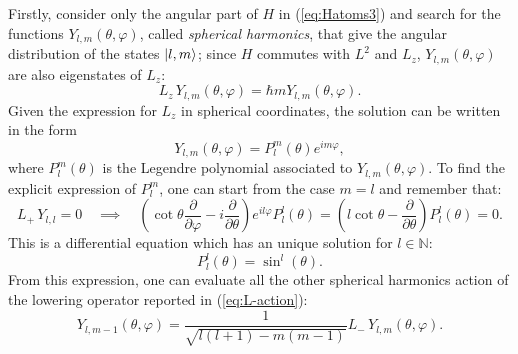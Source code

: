 Firstly, consider only the angular part of $H$ in (\ref{eq:Hatoms3}) and search for the functions $Y_{l,m}(\theta,\varphi)$, called \textit{spherical harmonics}, that give the angular distribution of the states $\ket{l,m}$; since $H$ commutes with $L^2$ and $L_z$, $Y_{l,m}(\theta,\varphi)$ are also eigenstates of $L_z$:
\begin{equation*}
    L_z \, Y_{l,m}(\theta,\varphi) = \hbar m Y_{l,m}(\theta,\varphi).
\end{equation*}
Given the expression for $L_z$ in spherical coordinates, the solution can be written in the form
\begin{equation}
    Y_{l,m}(\theta, \varphi) = P_l^m(\theta) e^{im\varphi}, 
\end{equation}
where $P_l^m(\theta)$ is the Legendre polynomial associated to $Y_{l,m}(\theta, \varphi)$. To find the explicit expression of $P_l^m$, one can start from the case $m = l$ and remember that:
\begin{equation*}
     L_+ \, Y_{l,l} = 0 \quad \implies \quad \left( \cot{\theta} \frac{\partial}{\partial \varphi} - i \frac{\partial}{\partial \theta}\right) e^{il\varphi} P_l^l (\theta) = \left( l \cot{\theta} - \frac{\partial}{\partial \theta} \right) P_l^l(\theta)= 0.
\end{equation*}
This is a differential equation which has an unique solution for $l \in \mathbb{N}$:
\begin{equation}
    P_l^l(\theta)=\sin^l{(\theta)}.
\end{equation}
From this expression, one can evaluate all the other spherical harmonics action of the lowering operator reported in (\ref{eq:L-action}):
\begin{equation*}
    Y_{l,m-1}(\theta, \varphi) = \frac{1}{\sqrt{l(l+1)-m(m-1)}} L_- \, Y_{l,m}(\theta, \varphi).
\end{equation*}

